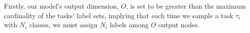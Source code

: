 \documentclass[letterpaper]{article} %
\newcommand{\jh}[1]{\textcolor{blue}{#1}}
\begin{document}

Firstly, our model's output dimension, $O$, is set to be greater than the maximum cardinality of the tasks' label sets, implying that each time we sample a task $\tau_i$ with $N_i$ classes, we must assign $N_i$ labels among $O$ output nodes. %
\end{document}
